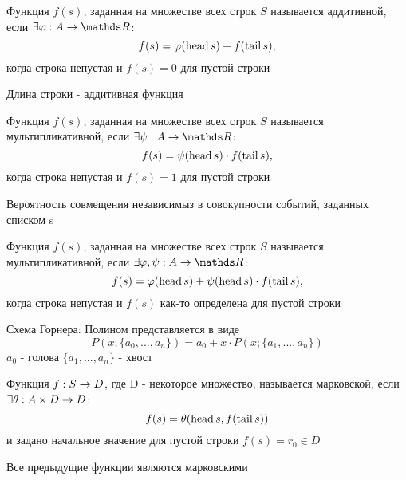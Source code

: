 \documentclass[discrete.tex]{subfiles}
\begin{document}
  \begin{definition}
    Функция $f(s)$, заданная на множестве всех строк $S$ называется аддитивной, если $\e \varphi: A \ra \R$:
    \[f(s) = \varphi(\mathop{\rm head}\nolimits s) + f(\mathop{\rm tail}\nolimits s),\]
    когда строка непустая и $f(s) = 0$ для пустой строки
  \end{definition}

  \begin{example}
    Длина строки - аддитивная функция
  \end{example}

  \begin{definition}
    Функция $f(s)$, заданная на множестве всех строк $S$ называется мультипликативной, если $\e \psi: A \ra \R$:
    \[f(s) = \psi(\mathop{\rm head}\nolimits s) \cdot f(\mathop{\rm tail}\nolimits s),\]
    когда строка непустая и $f(s) = 1$ для пустой строки
  \end{definition}

  \begin{example}
    Вероятность совмещения независимыз в совокупности событий, заданных списком s
  \end{example}

  \begin{definition}
    Функция $f(s)$, заданная на множестве всех строк $S$ называется мультипликативной, если $\e \varphi, \psi: A \ra \R$:
    \[f(s) = \varphi(\mathop{\rm head}\nolimits s) + \psi(\mathop{\rm head}\nolimits s) \cdot f(\mathop{\rm tail}\nolimits s),\]
    когда строка непустая и $f(s)$ как-то определена для пустой строки
  \end{definition}

  \begin{example}
    Схема Горнера: Полином представляется в виде
    \[P(x;\{a_0,...,a_n\}) = a_0 + x \cdot P(x; \{a_1,...,a_n\})\]
    $a_0$ - голова $\{a_1,...,a_n\}$ - хвост
  \end{example}

  \begin{definition}
    Функция $f: S \rightarrow D$, где D - некоторое множество, называется марковской, если $\exists \theta: A \times D \rightarrow D$:
    \[f(s) = \theta(\mathop{\rm head}\nolimits s, f(\mathop{\rm tail}\nolimits s))\]
    и задано начальное значение для пустой строки $f(s) = r_0 \in D$
  \end{definition}

  \begin{remark}
    Все предыдущие функции являются марковскими
  \end{remark}
\end{document}
